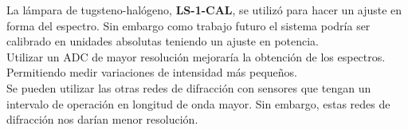 La lámpara de tugsteno-halógeno, \textbf{LS-1-CAL}, se utilizó para hacer un ajuste en forma del espectro. Sin embargo como trabajo futuro el sistema podría ser calibrado en unidades absolutas teniendo un ajuste en potencia. \\

Utilizar un ADC de mayor resolución mejoraría la obtención de los espectros. Permitiendo medir variaciones de intensidad más pequeños.\\

Se pueden utilizar las otras redes de difracción con sensores que tengan un intervalo de operación en longitud de onda mayor. Sin embargo, estas redes de difracción nos darían menor resolución. 
